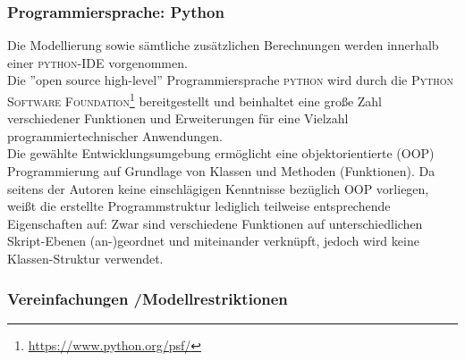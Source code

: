 \documentclass[onecolumn,10pt,titlepage]{article}
\begin{document}
\subsubsection{Programmiersprache: Python}
Die Modellierung sowie sämtliche zusätzlichen Berechnungen werden innerhalb einer \textsc{python}-IDE vorgenommen.\\
Die ''open source high-level'' Programmiersprache \textsc{python} wird durch die \textsc{Python Software Foundation\footnote{\url{https://www.python.org/psf/}}} bereitgestellt und beinhaltet eine große Zahl verschiedener Funktionen und Erweiterungen für eine Vielzahl programmiertechnischer Anwendungen.\\
Die gewählte Entwicklungsumgebung ermöglicht eine objektorientierte (OOP) Programmierung auf Grundlage von Klassen und Methoden (Funktionen).
Da seitens der Autoren keine einschlägigen Kenntnisse bezüglich OOP vorliegen, weißt die erstellte Programmstruktur lediglich teilweise entsprechende Eigenschaften auf: Zwar sind verschiedene Funktionen auf unterschiedlichen Skript-Ebenen (an-)geordnet und miteinander verknüpft, jedoch wird keine Klassen-Struktur verwendet. 



\subsubsection{Vereinfachungen /Modellrestriktionen}
\label{subsubs_Mod_Vereinfach}
\end{document}
